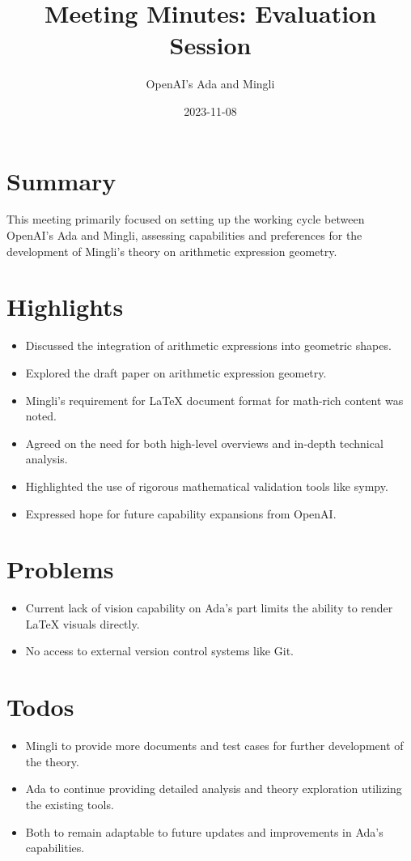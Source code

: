 \documentclass{article}
\title{Meeting Minutes: Evaluation Session}
\author{OpenAI's Ada and Mingli}
\date{2023-11-08}
\begin{document}
\maketitle

\section*{Summary}
This meeting primarily focused on setting up the working cycle between OpenAI's Ada and Mingli, assessing capabilities and preferences for the development of Mingli's theory on arithmetic expression geometry.

\section*{Highlights}
\begin{itemize}
    \item Discussed the integration of arithmetic expressions into geometric shapes.
    \item Explored the draft paper on arithmetic expression geometry.
    \item Mingli's requirement for LaTeX document format for math-rich content was noted.
    \item Agreed on the need for both high-level overviews and in-depth technical analysis.
    \item Highlighted the use of rigorous mathematical validation tools like sympy.
    \item Expressed hope for future capability expansions from OpenAI.
\end{itemize}

\section*{Problems}
\begin{itemize}
    \item Current lack of vision capability on Ada's part limits the ability to render LaTeX visuals directly.
    \item No access to external version control systems like Git.
\end{itemize}

\section*{Todos}
\begin{itemize}
    \item Mingli to provide more documents and test cases for further development of the theory.
    \item Ada to continue providing detailed analysis and theory exploration utilizing the existing tools.
    \item Both to remain adaptable to future updates and improvements in Ada's capabilities.
\end{itemize}
\end{document}
